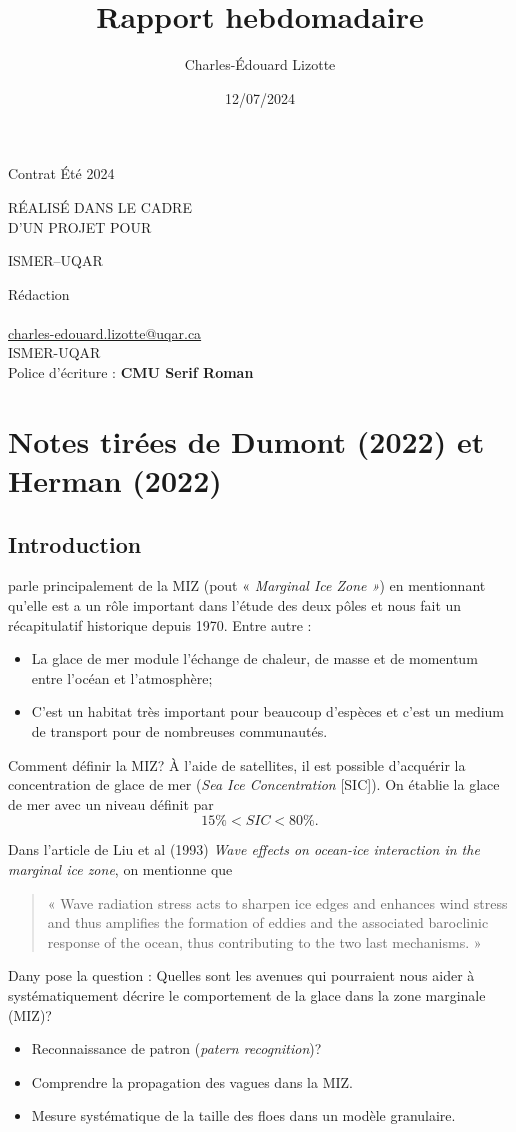 \documentclass[10pt]{article}
\author{Charles-Édouard Lizotte}
\date{12/07/2024}
\title{Rapport hebdomadaire}
\makeatletter
\numberwithin{equation}{section}
\newcommand{\mytitlepage}{
\begin{titlepage}
\begin{center}
{\Huge \thesubtitle \par}
\vspace{2cm}
{\Huge \MakeUppercase{\thetitle} \par}
\vspace{2cm}
RÉALISÉ DANS LE CADRE\\ D'UN PROJET POUR \par
\vspace{2cm}
{\Huge ISMER--UQAR \par}
\vspace{2cm}
{\thedate}
\end{center}
\vfill
Rédaction \\
{\theauthor}\\
\url{charles-edouard.lizotte@uqar.ca}\\
ISMER-UQAR\\
Police d'écriture : \textbf{CMU Serif Roman}
\end{titlepage}
}
\newcommand{\thesubtitle}{Contrat Été 2024}
\makeatother
\begin{document}
\mytitlepage
\tableofcontents\newpage
\section{Notes tirées de Dumont (2022) et Herman (2022)}
\label{sec:orgd2953c4}

\subsection{Introduction}
\label{sec:org238a17a}

\Textcite{dumont2022marginal} parle principalement de la MIZ (pout « \emph{Marginal Ice Zone »}) en mentionnant qu'elle est a un rôle important dans l'étude des deux pôles et nous fait un récapitulatif historique depuis 1970.
Entre autre : 
\begin{itemize}
\item La glace de mer module l'échange de chaleur, de masse et de momentum entre l'océan et l'atmosphère;
\item C'est un habitat très important pour beaucoup d'espèces et c'est un medium de transport pour de nombreuses communautés.
\end{itemize}

Comment définir la MIZ?
À l'aide de satellites, il est possible d'acquérir la concentration de glace de mer (\emph{Sea Ice Concentration} {[}SIC]).
On établie la glace de mer avec un niveau définit par
\begin{equation}
   15\% < SIC < 80\%. 
\end{equation}

Dans l'article de Liu et al (1993) \emph{Wave effects on ocean-ice interaction in the marginal ice
zone}, on mentionne que
\begin{quote}
« Wave radiation stress acts to sharpen ice edges and enhances wind stress and thus amplifies the formation of eddies and the associated baroclinic response of the ocean, thus contributing to the two last mechanisms. »
\end{quote}

Dany pose la question : Quelles sont les avenues qui pourraient nous aider à systématiquement décrire le comportement de la glace dans la zone marginale (MIZ)?
\begin{itemize}
\item Reconnaissance de patron (\emph{patern recognition})?
\item Comprendre la propagation des vagues dans la MIZ.
\item Mesure systématique de la taille des floes dans un modèle granulaire.
\end{itemize}
\end{document}
